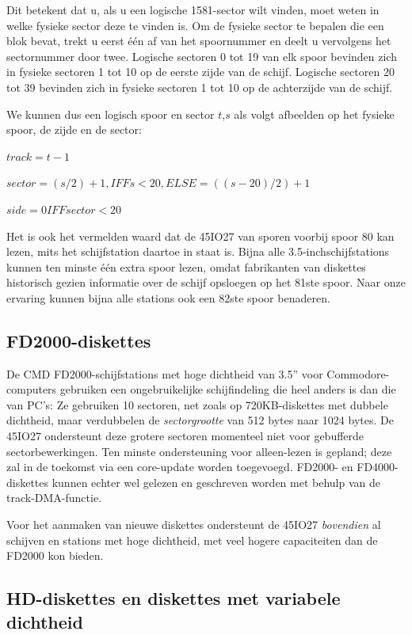 Dit betekent dat u, als u een logische 1581-sector wilt vinden, moet weten in welke fysieke sector deze te vinden is. Om de fysieke sector te bepalen die een blok bevat, trekt u eerst één af van het spoornummer en deelt u vervolgens het sectornummer door twee. Logische sectoren 0 tot 19 van elk spoor bevinden zich in fysieke sectoren 1 tot 10 op de eerste zijde van de schijf. Logische sectoren 20 tot 39 bevinden zich in fysieke sectoren 1 tot 10 op de achterzijde van de schijf.

We kunnen dus een logisch spoor en sector $t$,$s$ als volgt afbeelden op het fysieke spoor, de zijde en de sector:

$track = t - 1$

$sector = (s/2)+1, IFF s < 20, ELSE = ((s-20)/2) + 1$

$side = 0 IFF sector < 20$

Het is ook het vermelden waard dat de 45IO27 van sporen voorbij spoor 80 kan lezen, mits het schijfstation daartoe in staat is. Bijna alle 3.5-inchschijfstations kunnen ten minste één extra spoor lezen, omdat fabrikanten van diskettes historisch gezien informatie over de schijf opsloegen op het 81ste spoor. Naar onze ervaring kunnen bijna alle stations ook een 82ste spoor benaderen.

\subsection{FD2000-diskettes}

De CMD\texttrademark{} FD2000\texttrademark{}-schijfstations met hoge dichtheid van 3.5'' voor Commodore\texttrademark{}-computers gebruiken een ongebruikelijke schijfindeling die heel anders is dan die van PC's: Ze gebruiken 10 sectoren, net zoals op 720KB-diskettes met dubbele dichtheid, maar verdubbelen de {\em sectorgrootte} van 512 bytes naar 1024 bytes. De 45IO27 ondersteunt deze grotere sectoren momenteel niet voor gebufferde sectorbewerkingen. Ten minste ondersteuning voor alleen-lezen is gepland; deze zal in de toekomst via een core-update worden toegevoegd. FD2000\texttrademark{}- en FD4000\texttrademark{}-diskettes kunnen echter wel gelezen en geschreven worden met behulp van de track-DMA-functie.

Voor het aanmaken van nieuwe diskettes ondersteunt de 45IO27 {\em bovendien} al schijven en stations met hoge dichtheid, met veel hogere capaciteiten dan de FD2000 kon bieden.

\subsection{HD-diskettes en diskettes met variabele dichtheid}


